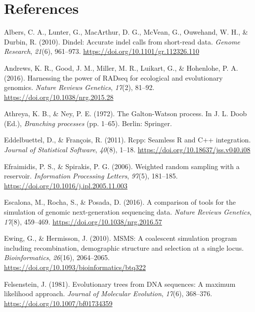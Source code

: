 \documentclass[12pt,]{article}
\begin{document}
\hypertarget{references}{%
\section*{References}\label{references}}

\hypertarget{refs}{}
\leavevmode\hypertarget{ref-Albers_2010}{}%
Albers, C. A., Lunter, G., MacArthur, D. G., McVean, G., Ouwehand, W.
H., \& Durbin, R. (2010). Dindel: Accurate indel calls from short-read
data. \emph{Genome Research}, \emph{21}(6), 961--973.
\url{https://doi.org/10.1101/gr.112326.110}

\leavevmode\hypertarget{ref-Andrews_2016}{}%
Andrews, K. R., Good, J. M., Miller, M. R., Luikart, G., \& Hohenlohe,
P. A. (2016). Harnessing the power of RADseq for ecological and
evolutionary genomics. \emph{Nature Reviews Genetics}, \emph{17}(2),
81--92. \url{https://doi.org/10.1038/nrg.2015.28}

\leavevmode\hypertarget{ref-Athreya_1972}{}%
Athreya, K. B., \& Ney, P. E. (1972). The Galton-Watson process. In J.
L. Doob (Ed.), \emph{Branching processes} (pp. 1--65). Berlin: Springer.

\leavevmode\hypertarget{ref-Eddelbuettel_2011}{}%
Eddelbuettel, D., \& François, R. (2011). Rcpp: Seamless R and C++
integration. \emph{Journal of Statistical Software}, \emph{40}(8),
1--18. \url{https://doi.org/10.18637/jss.v040.i08}

\leavevmode\hypertarget{ref-Efraimidis_2006}{}%
Efraimidis, P. S., \& Spirakis, P. G. (2006). Weighted random sampling
with a reservoir. \emph{Information Processing Letters}, \emph{97}(5),
181--185. \url{https://doi.org/10.1016/j.ipl.2005.11.003}

\leavevmode\hypertarget{ref-Escalona_2016}{}%
Escalona, M., Rocha, S., \& Posada, D. (2016). A comparison of tools for
the simulation of genomic next-generation sequencing data. \emph{Nature
Reviews Genetics}, \emph{17}(8), 459--469.
\url{https://doi.org/10.1038/nrg.2016.57}

\leavevmode\hypertarget{ref-Ewing_2010}{}%
Ewing, G., \& Hermisson, J. (2010). MSMS: A coalescent simulation
program including recombination, demographic structure and selection at
a single locus. \emph{Bioinformatics}, \emph{26}(16), 2064--2065.
\url{https://doi.org/10.1093/bioinformatics/btq322}

\leavevmode\hypertarget{ref-Felsenstein_1981}{}%
Felsenstein, J. (1981). Evolutionary trees from DNA sequences: A maximum
likelihood approach. \emph{Journal of Molecular Evolution},
\emph{17}(6), 368--376. \url{https://doi.org/10.1007/bf01734359}
\end{document}
